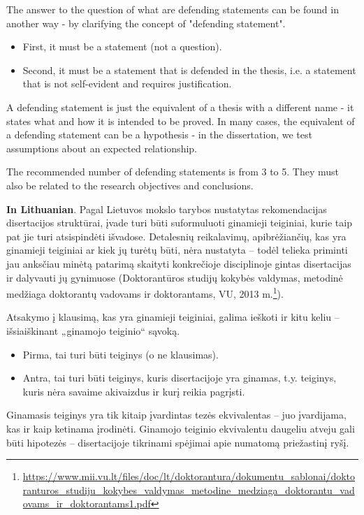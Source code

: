 The answer to the question of what are defending statements can be found in another way - by clarifying the concept of "defending statement".
\begin{itemize}
    \item First, it must be a statement (not a question).
    \item Second, it must be a statement that is defended in the thesis, i.e. a statement that is not self-evident and requires justification. 
\end{itemize}
A defending statement is just the equivalent of a thesis with a different name - it states what and how it is intended to be proved.
In many cases, the equivalent of a defending statement can be a hypothesis - in the dissertation, we test assumptions about an expected relationship.

The recommended number of defending statements is from 3 to 5. They must also be related to the research objectives and conclusions.

\textbf{In Lithuanian}. 
Pagal  Lietuvos  mokslo  tarybos  nustatytas  rekomendacijas  disertacijos struktūrai, įvade turi būti suformuluoti ginamieji teiginiai, kurie taip pat jie turi atsispindėti išvadose. 
Detalesnių reikalavimų, apibrėžiančių, kas  yra  ginamieji  teiginiai  ar kiek jų  turėtų būti,  nėra nustatyta – todėl telieka priminti jau anksčiau minėtą patarimą skaityti konkrečioje disciplinoje gintas disertacijas ir dalyvauti jų gynimuose (Doktorantūros studijų kokybės valdymas, metodinė medžiaga doktorantų vadovams ir doktorantams, VU, 2013 m.\footnote{\url{https://www.mii.vu.lt/files/doc/lt/doktorantura/dokumentu_sablonai/doktoranturos_studiju_kokybes_valdymas_metodine_medziaga_doktorantu_vadovams_ir_doktorantams1.pdf}
}).

Atsakymo į klausimą, kas yra ginamieji teiginiai, galima ieškoti ir kitu keliu – išsiaiškinant „ginamojo teiginio“ sąvoką. 
\begin{itemize}
    \item Pirma, tai turi būti teiginys (o ne klausimas). 
    \item Antra, tai turi būti teiginys, kuris disertacijoje yra ginamas, t.y. teiginys, kuris nėra savaime akivaizdus ir kurį reikia pagrįsti. 
\end{itemize}
Ginamasis teiginys yra tik kitaip įvardintas tezės ekvivalentas – juo įvardijama, kas ir kaip ketinama įrodinėti. 
Ginamojo teiginio ekvivalentu daugeliu atveju gali būti hipotezės – disertacijoje tikrinami spėjimai apie numatomą priežastinį ryšį.

